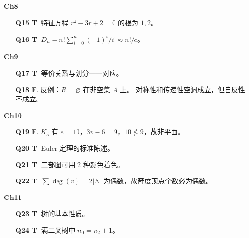 \documentclass[11pt,a4paper,fontset=mac]{ctexart}
\begin{document}
\medskip
\noindent\textbf{Ch8}
\begin{enumerate}[leftmargin=*,label={\textbf{Q\arabic*}.},wide,itemsep=0pt,start=15]

\item[\textbf{Q15}] \textbf{T}.  特征方程 $r^{2}-3r+2=0$ 的根为 $1,2$。

\item[\textbf{Q16}] \textbf{T}.  $D_n = n!\sum_{i=0}^{n}(-1)^{i}/i! \approx n!/e$。

\end{enumerate}

\medskip
\noindent\textbf{Ch9}
\begin{enumerate}[leftmargin=*,label={\textbf{Q\arabic*}.},wide,itemsep=0pt,start=17]

\item[\textbf{Q17}] \textbf{T}.  等价关系与划分一一对应。

\item[\textbf{Q18}] \textbf{F}.  反例：$R=\varnothing$ 在非空集 $A$ 上。
  对称性和传递性空洞成立，但自反性不成立。

\end{enumerate}

\medskip
\noindent\textbf{Ch10}
\begin{enumerate}[leftmargin=*,label={\textbf{Q\arabic*}.},wide,itemsep=0pt,start=19]

\item[\textbf{Q19}] \textbf{F}.  $K_5$ 有 $e=10$，$3v-6=9$，$10\not\le 9$，故非平面。

\item[\textbf{Q20}] \textbf{T}.  Euler 定理的标准陈述。

\item[\textbf{Q21}] \textbf{T}.  二部图可用 2 种颜色着色。

\item[\textbf{Q22}] \textbf{T}.  $\sum\deg(v)=2|E|$ 为偶数，故奇度顶点个数必为偶数。

\end{enumerate}

\medskip
\noindent\textbf{Ch11}
\begin{enumerate}[leftmargin=*,label={\textbf{Q\arabic*}.},wide,itemsep=0pt,start=23]

\item[\textbf{Q23}] \textbf{T}.  树的基本性质。

\item[\textbf{Q24}] \textbf{T}.  满二叉树中 $n_0=n_2+1$。

\end{enumerate}
\end{document}
